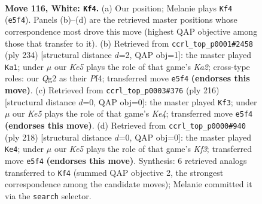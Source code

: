 \documentclass[11pt]{article}
\begin{document}
\clearpage

\begin{figure}[p]\centering
\begin{subfigure}{0.46\textwidth}\centering
\resizebox{\linewidth}{!}{%
\newchessgame
\chessboard[
  setfen={8/5k2/8/4K3/8/8/6Q1/8 w - - 11 116},
  showmover=false,
  pgfstyle=straightmove, color=movearrow, markmove={e5-f4}
]}
\caption{}
\end{subfigure}\hfill
\begin{subfigure}{0.46\textwidth}\centering
\resizebox{\linewidth}{!}{%
\newchessgame
\chessboard[
  setfen={8/8/8/8/1k3P2/8/K7/8 w - - 6 118},
  showmover=false,
  pgfstyle=straightmove, color=movearrow, markmove={a2-a1}
]}
\caption{}
\end{subfigure}
\\[4pt]
\begin{subfigure}{0.46\textwidth}\centering
\resizebox{\linewidth}{!}{%
\newchessgame
\chessboard[
  setfen={8/8/8/8/4K3/8/3Q4/6k1 w - - 6 109},
  showmover=false,
  pgfstyle=straightmove, color=movearrow, markmove={e4-f3}
]}
\caption{}
\end{subfigure}\hfill
\begin{subfigure}{0.46\textwidth}\centering
\resizebox{\linewidth}{!}{%
\newchessgame
\chessboard[
  setfen={k7/8/8/1Q6/8/5K2/8/8 w - - 5 110},
  showmover=false,
  pgfstyle=straightmove, color=movearrow, markmove={f3-e4}
]}
\caption{}
\end{subfigure}
\caption{\textbf{Move 116, White: \texttt{Kf4}.} (a) Our position; Melanie plays \texttt{Kf4} (\texttt{e5f4}). Panels (b)--(d) are the retrieved master positions whose correspondence most drove this move (highest QAP objective among those that transfer to it). (b) Retrieved from \texttt{ccrl\_top\_p0001\#2458} (ply 234) [structural distance $d$=2, QAP obj=1]: the master played \texttt{Ka1}; under $\mu$ our \emph{Ke5} plays the role of that game's \emph{Ka2}; cross-type roles: our \emph{Q}g2 as their \emph{P}f4; transferred move \texttt{e5f4} \textbf{(endorses this move)}. (c) Retrieved from \texttt{ccrl\_top\_p0003\#376} (ply 216) [structural distance $d$=0, QAP obj=0]: the master played \texttt{Kf3}; under $\mu$ our \emph{Ke5} plays the role of that game's \emph{Ke4}; transferred move \texttt{e5f4} \textbf{(endorses this move)}. (d) Retrieved from \texttt{ccrl\_top\_p0000\#940} (ply 218) [structural distance $d$=0, QAP obj=0]: the master played \texttt{Ke4}; under $\mu$ our \emph{Ke5} plays the role of that game's \emph{Kf3}; transferred move \texttt{e5f4} \textbf{(endorses this move)}. Synthesis: 6 retrieved analogs transferred to \texttt{Kf4} (summed QAP objective 2, the strongest correspondence among the candidate moves); Melanie committed it via the \texttt{search} selector.}
\label{fig:thought-m230}
\end{figure}
\end{document}
